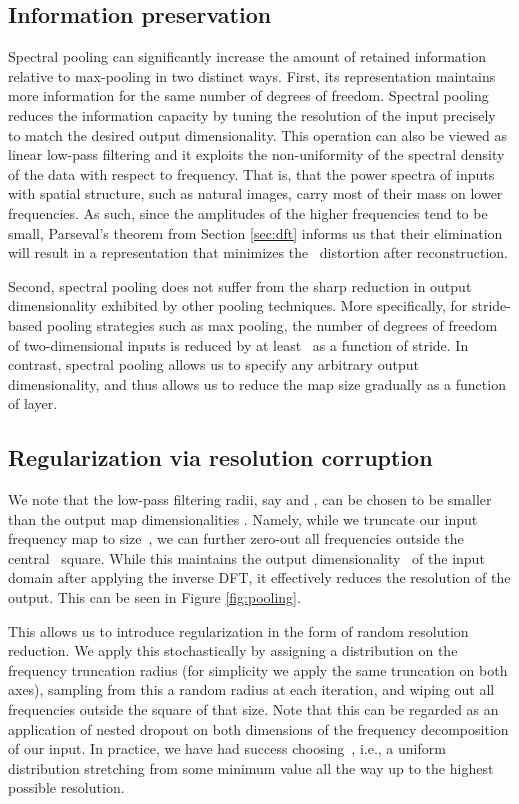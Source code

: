 \documentclass{article} \usepackage{nips15submit_e,times}
\begin{document}
\subsection{Information preservation}
\label{sec:info_pres}
Spectral pooling can significantly increase the amount of retained information relative to max-pooling in two distinct ways. First, its representation maintains more information for the same number of degrees of freedom. Spectral pooling reduces the information capacity by tuning the resolution of the input precisely to match the desired output dimensionality. This operation can also be viewed as linear low-pass filtering and it exploits the non-uniformity of the spectral density of the data with respect to frequency. That is, that the power spectra of inputs with spatial structure, such as natural images, carry most of their mass on lower frequencies. As such, since the amplitudes of the higher frequencies tend to be small, Parseval's theorem from Section \ref{sec:dft} informs us that their elimination will result in a representation that minimizes the~ distortion after reconstruction.

Second, spectral pooling does not suffer from the sharp reduction in output dimensionality exhibited by other pooling techniques. More specifically, for stride-based pooling strategies such as max pooling, the number of degrees of freedom of two-dimensional inputs is reduced by at least~ as a function of stride. In contrast, spectral pooling allows us to specify any arbitrary output dimensionality, and thus allows us to reduce the map size gradually as a function of layer. 


\subsection{Regularization via resolution corruption}
We note that the low-pass filtering radii, say  and , can be chosen to be smaller than the output map dimensionalities . Namely, while we truncate our input frequency map to size~, we can further zero-out all frequencies outside the central~ square. While this maintains the output dimensionality~ of the input domain after applying the inverse DFT, it effectively reduces the resolution of the output. This can be seen in Figure \ref{fig:pooling}.

This allows us to introduce regularization in the form of random resolution reduction. We apply this stochastically by assigning a distribution  on the frequency truncation radius (for simplicity we apply the same truncation on both axes), sampling from this a random radius at each iteration, and wiping out all frequencies outside the square of that size. Note that this can be regarded as an application of nested dropout \citep{rippel_2014} on both dimensions of the frequency decomposition of our input. In practice, we have had success choosing~, i.e., a uniform distribution stretching from some minimum value all the way up to the highest possible resolution. 
\end{document}
